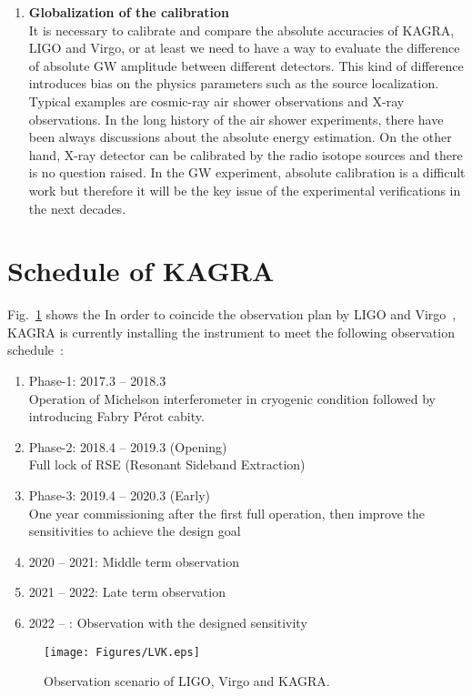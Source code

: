 \begin{enumerate}
\item {\bf Globalization of the calibration}\\
It is necessary to calibrate and compare the absolute accuracies of KAGRA, 
LIGO and Virgo, or at least we need to have a way to evaluate the difference 
of absolute GW amplitude between different detectors. This kind of difference 
introduces bias on the physics parameters such as the source localization. 
Typical examples are cosmic-ray air shower observations and X-ray 
observations. In the long history of the air shower experiments, 
there have been always discussions about the absolute energy estimation. 
On the other hand, X-ray detector can be calibrated by the radio isotope 
sources and there is no question raised. In the GW experiment, absolute 
calibration is a difficult work but therefore it will be the key issue of the 
experimental verifications in the next decades.

\end{enumerate}



\section{Schedule of KAGRA}

Fig.~\ref{fig:LVK} shows the 
In order to coincide the observation plan by LIGO and Virgo~\cite{LV-obs},
KAGRA is currently installing the instrument to meet the following observation
schedule~\cite{KAGRA-obs}:

\begin{enumerate}
\item Phase-1: 2017.3 -- 2018.3\\
      Operation of Michelson interferometer in cryogenic condition 
      followed by introducing Fabry P\'{e}rot cabity.
\item Phase-2: 2018.4 -- 2019.3 (Opening)\\
      Full lock of RSE (Resonant Sideband Extraction)
\item Phase-3: 2019.4 -- 2020.3 (Early) \\
      One year commissioning after the first full operation, 
      then improve the sensitivities to achieve the design goal
\item 2020 -- 2021: Middle term observation
\item 2021 -- 2022: Late term observation
\item 2022 -- : Observation with the designed sensitivity


\end{enumerate}
\begin{figure}
\begin{center}
\texttt{[image: Figures/LVK.eps]}
\caption{Observation scenario of LIGO, Virgo and KAGRA.} 
\label{fig:LVK} 
\end{center}
\end{figure}


